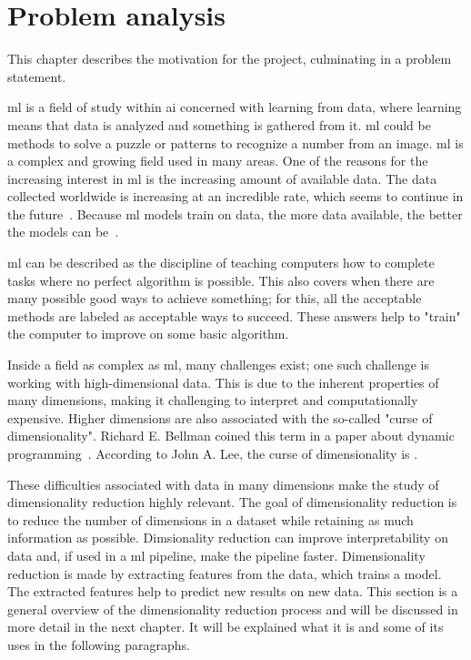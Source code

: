 \chapter{Problem analysis}\label{cha:problem-analysis}
This chapter describes the motivation for the project, culminating in a problem statement.

\gls{ml}  is a field of study within \gls{ai} concerned with learning from data, where learning means that data is analyzed and something is gathered from it.   \gls{ml}  could be methods to solve a puzzle or patterns to recognize a number from an image. \gls{ml}  is a complex and growing field used in many areas. One of the reasons for the increasing interest in \gls{ml} is the increasing amount of available data. The data collected worldwide is increasing at an incredible rate, which seems to continue in the future~\cite{data-never-sleeps}. Because \gls{ml} models train on data, the more data available, the better the models can be~\cite{Unreasonable-effectiveness-of-data-Norvig}.

\gls{ml} can be described as the discipline of teaching computers how to complete tasks where no perfect algorithm is possible. This also covers when there are many possible good ways to achieve something; for this, all the acceptable methods are labeled as acceptable ways to succeed. These answers help to "train" the computer to improve on some basic algorithm\cite{alpaydin2020introduction}.

Inside a field as complex as \gls{ml}, many challenges exist; one such challenge is working with high-dimensional data. This is due to the inherent properties of many dimensions, making it challenging to interpret and computationally expensive. Higher dimensions are also associated with the so-called "curse of dimensionality". Richard E. Bellman coined this term in a paper about dynamic programming~\cite{bellmanrand}. According to John A. Lee, the curse of dimensionality is .

These difficulties associated with data in many dimensions make the study of dimensionality reduction highly relevant. The goal of dimensionality reduction is to reduce the number of dimensions in a dataset while retaining as much information as possible. Dimsionality reduction can improve interpretability on data and, if used in a \gls{ml} pipeline, make the pipeline faster. Dimensionality reduction is made by extracting features from the data, which trains a model. The extracted features help to predict new results on new data. This section is a general overview of the dimensionality reduction process and will be discussed in more detail in the next chapter.
It will be explained what it is and some of its uses in the following paragraphs.

